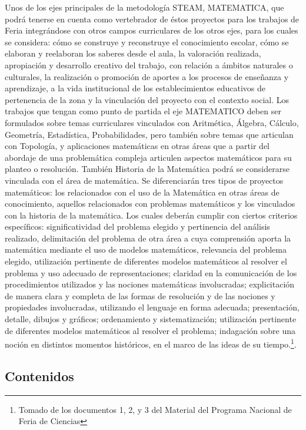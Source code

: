 Unos de los ejes principales de la metodología STEAM, MATEMATICA, que podrá tenerse en cuenta como vertebrador de éstos proyectos para los trabajos de Feria integrándose con otros campos curriculares de los otros ejes, para los cuales se considera: cómo se construye y reconstruye el conocimiento escolar, cómo se elaboran y reelaboran los saberes desde el aula, la valoración realizada, apropiación y desarrollo creativo del trabajo, con relación a ámbitos naturales o culturales, la realización o promoción de aportes a los procesos de enseñanza y aprendizaje, a la vida institucional de los establecimientos educativos de pertenencia de la zona y la vinculación del proyecto con el contexto social. Los trabajos que tengan como punto de partida el eje MATEMATICO deben ser formulados sobre temas curriculares vinculados con Aritmética, Álgebra, Cálculo, Geometría, Estadística, Probabilidades, pero también sobre temas que articulan con Topología, y aplicaciones matemáticas en otras áreas que a partir del abordaje de una problemática compleja articulen aspectos matemáticos para su planteo o resolución. También Historia de la Matemática podrá se considerarse vinculada con el área de matemática. Se diferenciarán tres tipos de proyectos matemáticos: los relacionados con el uso de la Matemática en otras áreas de conocimiento, aquellos relacionados con problemas matemáticos y los vinculados con la historia de la matemática. Los cuales deberán cumplir con ciertos criterios específicos: significatividad del problema elegido y pertinencia del análisis realizado, delimitación del problema de otra área a cuya comprensión aporta la matemática mediante el uso de modelos matemáticos, relevancia del problema elegido, utilización pertinente de diferentes modelos matemáticos al resolver el problema y uso adecuado de representaciones; claridad en la comunicación de los procedimientos utilizados y las nociones matemáticas involucradas; explicitación de manera clara y completa de las formas de resolución y de las nociones y propiedades involucradas, utilizando el lenguaje en forma adecuada; presentación, detalle, dibujos y gráficos; ordenamiento y sistematización; utilización pertinente de diferentes modelos matemáticos al resolver el problema; indagación sobre una noción en distintos momentos históricos, en el marco de las ideas de su tiempo.\footnote{Tomado de los documentos 1, 2, y 3 del Material del Programa Nacional de Feria de Ciencias}.

\subsection{Contenidos}

